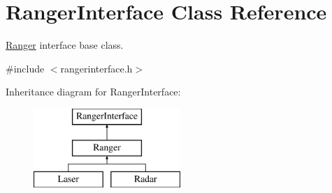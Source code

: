 \hypertarget{classRangerInterface}{}\section{Ranger\+Interface Class Reference}
\label{classRangerInterface}


\hyperlink{classRanger}{Ranger} interface base class.  




{\ttfamily \#include $<$rangerinterface.\+h$>$}

Inheritance diagram for Ranger\+Interface\+:\begin{figure}[H]
\begin{center}
\leavevmode
\includegraphics[height=3.000000cm]{classRangerInterface}
\end{center}
\end{figure}
